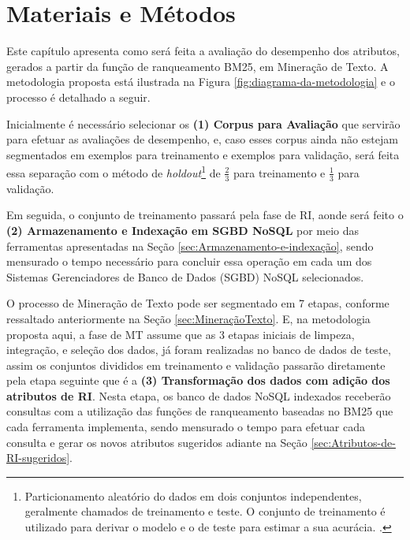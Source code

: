 \chapter{Materiais e Métodos} \label{ch:MateriaisMétodos} %
    Este capítulo apresenta como será feita a avaliação do desempenho dos atributos, gerados a partir da função de ranqueamento BM25, em Mineração de Texto.
    A metodologia proposta está ilustrada na Figura \ref{fig:diagrama-da-metodologia} e o processo é detalhado a seguir.
    
    
    
    Inicialmente é necessário selecionar os \textbf{(1) Corpus para Avaliação} que servirão para efetuar as avaliações de desempenho, e, caso esses corpus ainda não estejam segmentados em exemplos para treinamento e exemplos para validação, será feita essa separação com o método de \textit{holdout}\footnote{Particionamento aleatório do dados em dois conjuntos independentes, geralmente chamados de treinamento e teste. O conjunto de treinamento é utilizado para derivar o modelo e o de teste para estimar a sua acurácia. \cite[p.~370]{Han:2011:DMC:1972541}.} de $\frac{2}{3}$ para treinamento e $\frac{1}{3}$ para validação.
    
    Em seguida, o conjunto de treinamento passará pela fase de RI, aonde será feito o \textbf{(2) Armazenamento e Indexação em  SGBD NoSQL} por meio das ferramentas apresentadas na Seção  \ref{sec:Armazenamento-e-indexação}, sendo mensurado o tempo necessário para concluir essa operação em cada um dos Sistemas Gerenciadores de Banco de Dados (SGBD) NoSQL selecionados.
    
    O processo de Mineração de Texto pode ser segmentado em 7 etapas, conforme ressaltado anteriormente na Seção \ref{sec:MineraçãoTexto}.
    E, na metodologia proposta aqui, a fase de MT assume que as 3 etapas iniciais de limpeza, integração, e seleção dos dados, já foram realizadas no banco de dados de teste, assim os conjuntos divididos em treinamento e validação passarão diretamente pela etapa seguinte que é a \textbf{(3) Transformação dos dados com adição dos atributos de RI}.
    Nesta etapa, os banco de dados NoSQL indexados receberão consultas com a utilização das funções de ranqueamento baseadas no BM25 que cada ferramenta implementa, sendo mensurado o tempo para efetuar cada consulta e gerar os novos atributos sugeridos adiante na Seção \ref{sec:Atributos-de-RI-sugeridos}.
    
